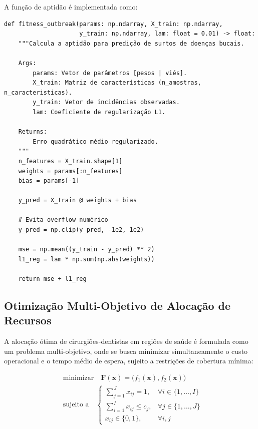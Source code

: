 A função de aptidão é implementada como:

\begin{lstlisting}[style=pythonstyle, caption=Função de aptidão para predição de surtos, label=code:fitness_outbreak]
def fitness_outbreak(params: np.ndarray, X_train: np.ndarray,
                     y_train: np.ndarray, lam: float = 0.01) -> float:
    """Calcula a aptidão para predição de surtos de doenças bucais.
    
    Args:
        params: Vetor de parâmetros [pesos | viés].
        X_train: Matriz de características (n_amostras, n_caracteristicas).
        y_train: Vetor de incidências observadas.
        lam: Coeficiente de regularização L1.
    
    Returns:
        Erro quadrático médio regularizado.
    """
    n_features = X_train.shape[1]
    weights = params[:n_features]
    bias = params[-1]
    
    y_pred = X_train @ weights + bias
    
    # Evita overflow numérico
    y_pred = np.clip(y_pred, -1e2, 1e2)
    
    mse = np.mean((y_train - y_pred) ** 2)
    l1_reg = lam * np.sum(np.abs(weights))
    
    return mse + l1_reg
\end{lstlisting}

\subsection{Otimização Multi-Objetivo de Alocação de Recursos}

A alocação ótima de cirurgiões-dentistas em regiões de saúde é formulada como um problema multi-objetivo, onde se busca minimizar simultaneamente o custo operacional e o tempo médio de espera, sujeito a restrições de cobertura mínima:

\begin{equation}
\begin{aligned}
&\text{minimizar} \quad \mathbf{F}(\mathbf{x}) = \bigl(f_1(\mathbf{x}), f_2(\mathbf{x})\bigr) \\
&\text{sujeito a} \quad \begin{cases}
\sum_{j=1}^J x_{ij} = 1, & \forall i \in \{1,\ldots,I\} \\
\sum_{i=1}^I x_{ij} \leq c_j, & \forall j \in \{1,\ldots,J\} \\
x_{ij} \in \{0,1\}, & \forall i,j
\end{cases}
\end{aligned}
\label{eq:multiobj_resource}
\end{equation}

